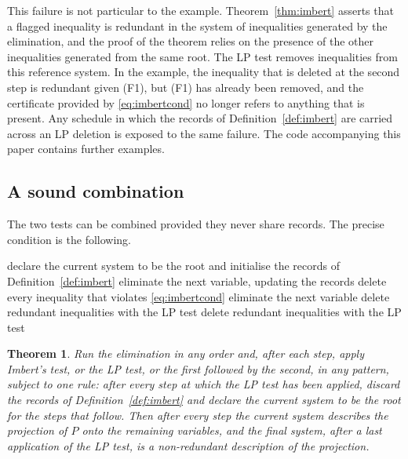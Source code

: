 \documentclass[11pt]{article}
\newtheorem{theorem}{Theorem}
\theoremstyle{definition}
\begin{document}
This failure is not particular to the example. Theorem~\ref{thm:imbert} asserts that a flagged inequality is redundant in the system of inequalities generated by the elimination, and the proof of the theorem relies on the presence of the other inequalities generated from the same root. The LP test removes inequalities from this reference system. In the example, the inequality that is deleted at the second step is redundant given (F1), but (F1) has already been removed, and the certificate provided by \eqref{eq:imbertcond} no longer refers to anything that is present. Any schedule in which the records of Definition~\ref{def:imbert} are carried across an LP deletion is exposed to the same failure. The code accompanying this paper contains further examples.

\subsection{A sound combination}
\label{sec:sound}

The two tests can be combined provided they never share records. The precise condition is the following.

\begin{algorithm}[t]
\caption{Alternation of Imbert's test and the LP test with epoch length $T$.}
\label{alg:alternation}
\begin{algorithmic}[1]
  \State declare the current system to be the root and initialise the records of Definition~\ref{def:imbert}
     \State eliminate the next variable, updating the records
     \State delete every inequality that violates \eqref{eq:imbertcond}
  \EndFor
     \State eliminate the next variable
     \State delete redundant inequalities with the LP test
  \EndIf
\EndWhile
\State delete redundant inequalities with the LP test 
\end{algorithmic}
\end{algorithm}

\begin{theorem}
\label{prop:sound}
Run the elimination in any order and, after each step, apply Imbert's test, or the LP test, or the first followed by the second, in any pattern, subject to one rule: after every step at which the LP test has been applied, discard the records of Definition~\ref{def:imbert} and declare the current system to be the root for the steps that follow. Then after every step the current system describes the projection of $P$ onto the remaining variables, and the final system, after a last application of the LP test, is a non-redundant description of the projection.
\end{theorem}
\end{document}
